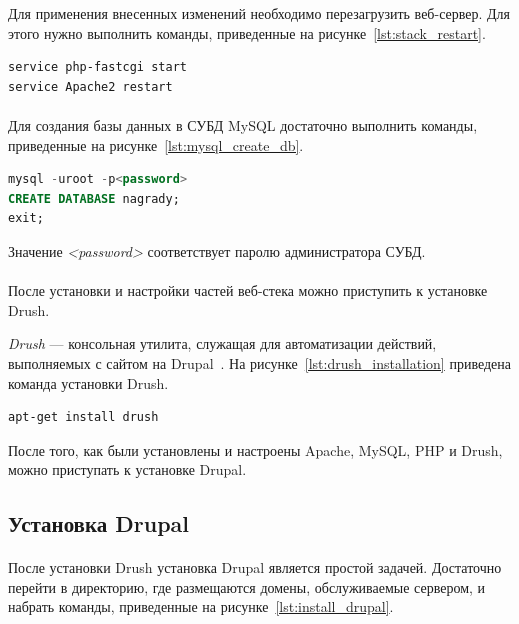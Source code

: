 Для применения внесенных изменений необходимо перезагрузить веб-сервер. 
Для этого нужно выполнить команды, приведенные на рисунке~\ref{lst:stack_restart}. 

\begin{lstlisting}[language=bash,
  caption=Команды перезагрузки веб-сервера,
  label=lst:stack_restart]
service php-fastcgi start
service Apache2 restart
\end{lstlisting}

\paragraph{}
Для создания базы данных в СУБД MySQL достаточно выполнить команды,
приведенные на рисунке~\ref{lst:mysql_create_db}.

\begin{lstlisting}[language=SQL,alsolanguage=bash,
  caption=Создание базы данных в СУБД MySQL,
  label=lst:mysql_create_db]
mysql -uroot -p<password>
CREATE DATABASE nagrady;
exit;
\end{lstlisting}

Значение \textit{<password>} соответствует паролю администратора СУБД.

\paragraph{}
После установки и настройки частей веб-стека можно
приступить к установке Drush.

\textit{Drush} --- консольная утилита, служащая для автоматизации действий,
выполняемых с сайтом на Drupal~\cite{drush_about}.
На рисунке~\ref{lst:drush_installation} приведена команда установки Drush.

\begin{lstlisting}[language=bash,
  caption=Команда установки Drush,
  label=lst:drush_installation]
apt-get install drush
\end{lstlisting}

После того, как были установлены и настроены Apache, MySQL, PHP и Drush,
можно приступать к установке Drupal.

\subsection{Установка Drupal}
\label{ssec:drupal_installation}

\paragraph{}
После установки Drush установка Drupal является простой задачей.
Достаточно перейти в директорию, где размещаются домены, обслуживаемые сервером,
и набрать команды, приведенные на рисунке~\ref{lst:install_drupal}.

